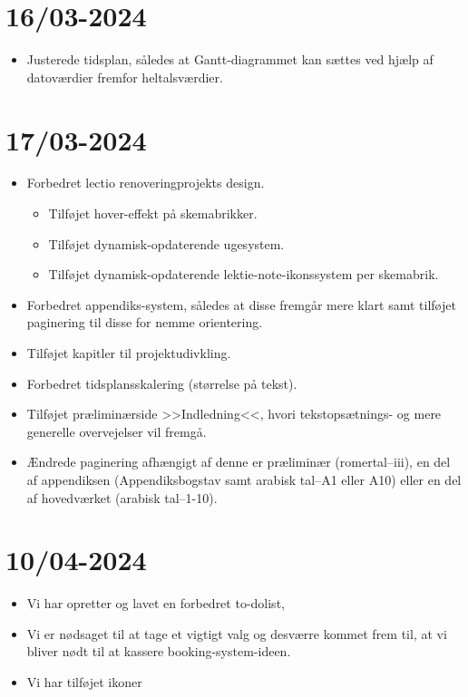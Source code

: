 \documentclass[12pt, a4paper]{article}
\begin{document}
    \section{16/03-2024}
        \begin{itemize}
            \item Justerede tidsplan, således at Gantt-diagrammet kan sættes ved hjælp af datoværdier fremfor heltalsværdier.
        \end{itemize}

    \section{17/03-2024}
        \begin{itemize}
            \item Forbedret lectio renoveringprojekts design.
            \begin{itemize}
                \item Tilføjet hover-effekt på skemabrikker.
                \item Tilføjet dynamisk-opdaterende ugesystem.
                \item Tilføjet dynamisk-opdaterende lektie-note-ikonssystem per skemabrik.
            \end{itemize}
            \item Forbedret appendiks-system, således at disse fremgår mere klart samt tilføjet paginering til disse for nemme orientering.
            \item Tilføjet kapitler til projektudivkling.
            \item Forbedret tidsplansskalering (størrelse på tekst).
            \item Tilføjet præliminærside >>Indledning<<, hvori tekstopsætnings- og mere generelle overvejelser vil fremgå.
            \item Ændrede paginering afhængigt af denne er præliminær (romertal--iii), en del af appendiksen (Appendiksbogstav samt arabisk tal--A1 eller A10) eller en del af hovedværket (arabisk tal--1-10).
        \end{itemize}

    \section{10/04-2024}
        \begin{itemize}
            \item Vi har opretter og lavet en forbedret to-dolist, 
            \item Vi er nødsaget til at tage et vigtigt valg og desværre kommet frem til, at vi bliver nødt til at kassere booking-system-ideen.
            \item Vi har tilføjet ikoner
        \end{itemize}
\end{document}
